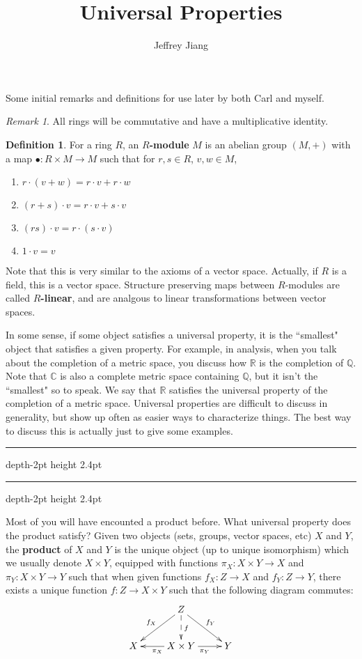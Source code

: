 \documentclass[psamsfonts]{amsart}
\theoremstyle{definition}
\newtheorem{defn}[thm]{Definition}
\theoremstyle{remark}
\newtheorem*{rem*}{Remark}
\newcommand{\R}{\mathbb{R}}
\newcommand{\Q}{\mathbb{Q}}
\newcommand{\C}{\mathbb{C}}
\newcommand*\myhrulefill{%
   \leavevmode\leaders\hrule depth-2pt height 2.4pt\hfill\kern0pt}
\newcommand\niceending[1]{%
  \begin{center}%
    \LARGE \myhrulefill \hspace{0.2cm} #1 \hspace{0.2cm} \myhrulefill%
  \end{center}}
\newcommand*\subsectionend{\niceending{\decosix}}
\begin{document}
\author{Jeffrey Jiang}
\title{Universal Properties}
\maketitle

\Large
Some initial remarks and definitions for use later by both Carl and myself.
\begin{rem*}
All rings will be commutative and have a multiplicative identity.
\end{rem*}

\begin{defn}
For a ring $R$, an $R$\textbf{-module} $M$ is an abelian group $(M,+)$ with a map $\bullet: R\times M \to M$ such that for $r,s \in R$, $v,w \in M$,
\begin{enumerate}
\item $r \cdot(v + w) = r \cdot v + r\cdot w$
\item $(r+s)\cdot v = r\cdot v + s \cdot v$
\item $(rs) \cdot v = r\cdot(s\cdot v)$
\item $1\cdot v = v$
\end{enumerate}
Note that this is very similar to the axioms of a vector space. Actually, if $R$ is a field, this is a vector space. Structure preserving maps between $R$-modules are called $R$\textbf{-linear}, and are analgous to linear transformations between vector spaces.
\end{defn}
In some sense, if some object satisfies a universal property, it is the ``smallest" object that satisfies a given property. For example, in analysis, when you talk about the completion of a metric space, you discuss how $\R$ is the completion of $\Q$. Note that $\C$ is also a complete metric space containing $\Q$, but it isn't the ``smallest" so to speak. We say that $\R$ satisfies the universal property of the completion of a metric space. Universal properties are difficult to discuss in generality, but show up often as easier ways to characterize things. The best way to discuss this is actually just to give some examples.
\subsectionend

Most of you will have encounted a product before. What universal property does the product satisfy? Given two objects (sets, groups, vector spaces, etc) $X$ and $Y$, the \textbf{product} of $X$ and $Y$ is the unique object (up to unique isomorphism) which we usually denote $X \times Y$, equipped with functions $\pi_X: X \times Y \to X$ and $\pi_Y: X \times Y \to Y$ such that when given functions $f_X: Z \to X$ and $f_Y: Z \to Y$, there exists a unique function $f: Z \to X\times Y$ such that the following diagram commutes:
\begin{align*}
\xymatrix{
& Z\ar[dl]_{f_X} \ar@{-->}[d]^f \ar[dr]^{f_Y}  & \\
X  & \ar[l]^{\pi_X} X\times Y \ar[r]_{\pi_Y} & Y
}
\end{align*}
\end{document}
